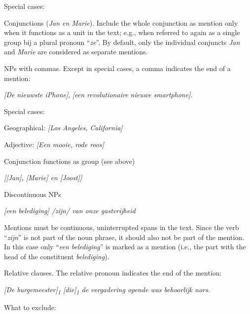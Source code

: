Special cases:
\begin{itemize*}
\item Conjunctions (\emph{Jan en Marie}). Include the whole conjunction as
  mention only when it functions as a unit in the text;
  e.g., when referred to again as a single group bij a plural pronoun ``\emph{ze}''.
  By default, only the individual conjuncts \emph{Jan} and \emph{Marie} are
  considered as separate mentions.
\item NPs with commas.
    Except in special cases, a comma indicates the end of a mention:

    \emph{[De nieuwste iPhone]}, \emph{[een revolutionaire nieuwe smartphone]}.

    Special cases:
    \begin{itemize*}
        \item Geographical: \emph{{[}Los Angeles, California{]}}
        \item Adjective: \emph{{[}Een mooie, rode roos{]}}
        \item Conjunction functions as group (see above)
        
          \emph{{[}{[}Jan{]}, {[}Marie{]} en {[}Joost{]}{]}}
          
    \end{itemize*}

\item Discontinuous NPs

  \emph{\n{[}[een belediging] /zijn/ van onze gastvrijheid\n{]}}
  
    Mentions must be continuous, uninterrupted spans in the text.
    Since the verb ``\emph{zijn}'' is not part of the noun phrase,
    it should also not be part of the mention.
    In this case only ``\emph{een belediging}'' is marked as a mention
    (i.e., the part with the head of the constituent \emph{belediging}).

\item Relative clauses.
    The relative pronoun indicates the end of the mention:
  
    \emph{\n{[}[De burgemeester]\textsubscript{1} {[}die{]}\textsubscript{1} de vergadering opende\n{]} was behoorlijk nors.}

\end{itemize*}

What to exclude:

